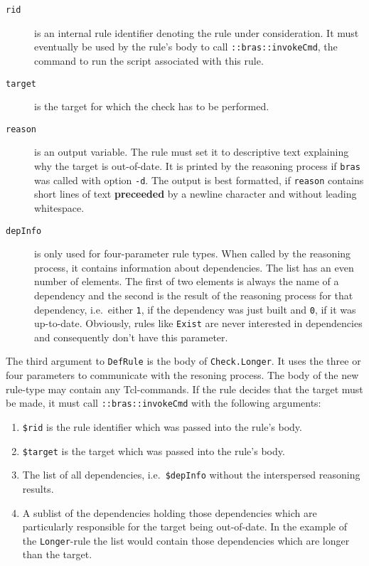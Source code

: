 \documentclass[12pt]{article}
\newcommand{\bras}{\texttt{bras}}
\begin{document}
\begin{description}
\item[\texttt{rid}] is an internal rule identifier denoting the rule under
  consideration. It must eventually be used by the rule's body to call
  \texttt{::bras::invokeCmd}, the command to run the script associated
  with this rule.

\item[\texttt{target}] is the target for which the check has to be
  performed.

\item[\texttt{reason}] is an output variable. The rule must set it to
  descriptive text explaining why the target is out-of-date. It is
  printed by the reasoning process if \bras{} was called with option
  \texttt{-d}. The output is best formatted, if \texttt{reason}
  contains short lines of text \textbf{preceeded} by a newline
  character and without leading whitespace.
  
\item[\texttt{depInfo}] is only used for four-parameter rule types. When
  called by the reasoning process, it contains information about
  dependencies. The list has an even number of elements. The
  first of two elements is always the name of a dependency and the
  second is the result of the reasoning process for that dependency,
  i.e.\ either \texttt{1}, if the dependency was just built and
  \texttt{0}, if it was up-to-date. Obviously, rules like
  \texttt{Exist} are never interested in dependencies and consequently
  don't have this parameter.
\end{description}

The third argument to \texttt{DefRule} is the body of
\texttt{Check.Longer}. It uses the three or four parameters to
communicate with the resoning process. The body of the new rule-type
may contain any Tcl-commands. If the rule decides that the target must
be made, it must call \texttt{::bras::invokeCmd} with the following
arguments:

\begin{enumerate}
\item \texttt{\$rid} is the rule identifier which was passed into the
  rule's body.
\item \texttt{\$target} is the target which was passed into the
  rule's body.
\item The list of all dependencies, i.e.\ \texttt{\$depInfo} without
  the interspersed reasoning results.
\item A sublist of the dependencies holding those dependencies
  which are particularly responsible for the target being
  out-of-date. In the example of the \texttt{Longer}-rule the list
  would contain those dependencies which are longer than the target.
\end{enumerate}
\end{document}
